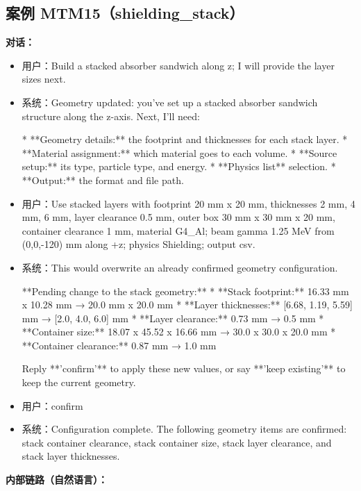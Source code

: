 \documentclass[11pt]{ctexart}
\begin{document}
\subsection{案例 MTM15（shielding\_stack）}
\textbf{对话：}
\begin{itemize}
\item 用户：Build a stacked absorber sandwich along z; I will provide the layer sizes next.
\item 系统：Geometry updated: you've set up a stacked absorber sandwich structure along the z-axis. Next, I'll need:

*   **Geometry details:** the footprint and thicknesses for each stack layer.
*   **Material assignment:** which material goes to each volume.
*   **Source setup:** its type, particle type, and energy.
*   **Physics list** selection.
*   **Output:** the format and file path.
\item 用户：Use stacked layers with footprint 20 mm x 20 mm, thicknesses 2 mm, 4 mm, 6 mm, layer clearance 0.5 mm, outer box 30 mm x 30 mm x 20 mm, container clearance 1 mm, material G4\_Al; beam gamma 1.25 MeV from (0,0,-120) mm along +z; physics Shielding; output csv.
\item 系统：This would overwrite an already confirmed geometry configuration.

**Pending change to the stack geometry:**
*   **Stack footprint:** 16.33 mm x 10.28 mm → 20.0 mm x 20.0 mm
*   **Layer thicknesses:** [6.68, 1.19, 5.59] mm → [2.0, 4.0, 6.0] mm
*   **Layer clearance:** 0.73 mm → 0.5 mm
*   **Container size:** 18.07 x 45.52 x 16.66 mm → 30.0 x 30.0 x 20.0 mm
*   **Container clearance:** 0.87 mm → 1.0 mm

Reply **'confirm'** to apply these new values, or say **'keep existing'** to keep the current geometry.
\item 用户：confirm
\item 系统：Configuration complete. The following geometry items are confirmed: stack container clearance, stack container size, stack layer clearance, and stack layer thicknesses.
\end{itemize}
\textbf{内部链路（自然语言）：}
\end{document}
